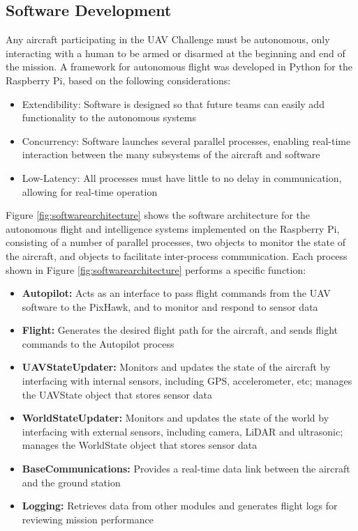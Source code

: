 \subsection{Software Development}
Any aircraft participating in the UAV Challenge must be autonomous, only interacting with a human to be armed or disarmed at the beginning and end of the mission. A framework for autonomous flight was developed in Python for the Raspberry Pi, based on the following considerations:
\begin{itemize}
	\item Extendibility: Software is designed so that future teams can easily add functionality to the autonomous systems
	\item Concurrency: Software launches several parallel processes, enabling real-time interaction between the many subsystems of the aircraft and software
	\item Low-Latency: All processes must have little to no delay in communication, allowing for real-time operation 
\end{itemize}

Figure \ref{fig:softwarearchitecture} shows the software architecture for the autonomous flight and intelligence systems implemented on the Raspberry Pi, consisting of a number of parallel processes, two objects to monitor the state of the aircraft, and objects to facilitate inter-process communication. Each process shown in Figure \ref{fig:softwarearchitecture} performs a specific function:
\begin{itemize}
	\item \textbf{Autopilot:} Acts as an interface to pass flight commands from the UAV software to the PixHawk, and to monitor and respond to sensor data
	\item \textbf{Flight:} Generates the desired flight path for the aircraft, and sends flight commands to the Autopilot process
	\item \textbf{UAVStateUpdater:} Monitors and updates the state of the aircraft by interfacing with internal sensors, including GPS, accelerometer, etc; manages the UAVState object that stores sensor data
	\item \textbf{WorldStateUpdater:} Monitors and updates the state of the world by interfacing with external sensors, including camera, LiDAR and ultrasonic; manages the WorldState object that stores sensor data
	\item \textbf{BaseCommunications:} Provides a real-time data link between the aircraft and the ground station
	\item \textbf{Logging:} Retrieves data from other modules and generates flight logs for reviewing mission performance
\end{itemize}

